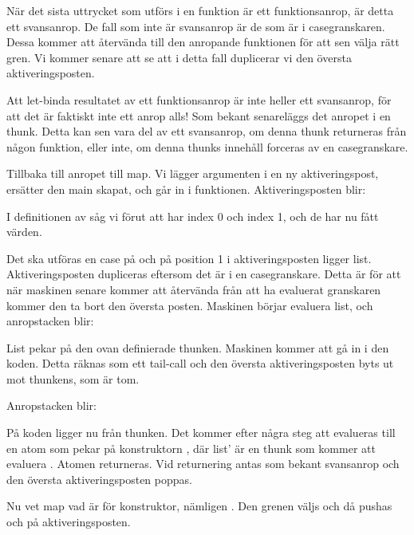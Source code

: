\documentclass[../Core]{subfiles}
\begin{document}
När det sista uttrycket som utförs i en funktion är ett funktionsanrop, är
detta ett svansanrop. De fall som inte är svansanrop
är de som är i casegranskaren. Dessa kommer att återvända till den anropande
funktionen för att sen välja rätt gren. Vi kommer senare att se att i detta
fall duplicerar vi den översta aktiveringsposten. 

Att let-binda resultatet av ett
funktionsanrop är inte heller ett svansanrop, för att det är faktiskt inte ett
anrop alls! Som bekant senareläggs det anropet i en thunk. Detta kan sen vara
del av ett svansanrop, om denna thunk returneras från någon funktion, eller inte,
om denna thunks innehåll forceras av en casegranskare.

Tillbaka till anropet till map. 
Vi lägger argumenten i en ny aktiveringspost, ersätter den main skapat,
och går in i funktionen. 
Aktiveringsposten blir:
\begin{codeEx}
\end{codeEx}
I definitionen av  såg vi förut att  har index 0 och
 index 1, och de har nu fått värden.

Det ska utföras en case på  och på position 1 i
aktiveringsposten ligger list. Aktiveringsposten dupliceras eftersom
det är i en casegranskare. Detta är för att när maskinen senare kommer
att återvända från att ha evaluerat granskaren kommer den ta bort den 
översta posten. Maskinen börjar evaluera list, och anropstacken blir:
\begin{codeEx}
\end{codeEx}

List pekar på den ovan definierade thunken. Maskinen kommer att gå in i den
koden. Detta räknas som ett tail-call och den översta aktiveringsposten byts
ut mot thunkens, som är tom.

Anropstacken blir:
\begin{codeEx}
\end{codeEx}

På koden ligger nu  från thunken. 
Det kommer efter några steg att evalueras till en atom 
som pekar på 
konstruktorn , där list' är
en thunk som kommer att evaluera . 
Atomen
returneras. Vid returnering antas som bekant svansanrop och 
den översta aktiveringsposten poppas.


Nu vet map vad  är för konstruktor, nämligen
. Den grenen väljs och då pushas  och 
 på aktiveringsposten. 
\end{document}
